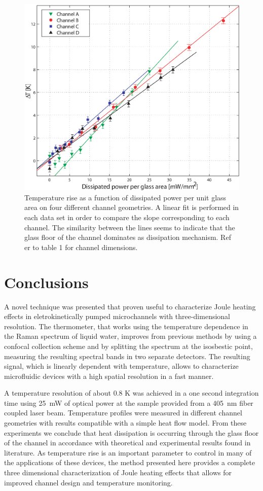 \documentclass[twocolumn]{svjour3}       %
\begin{document}
\begin{figure}[h!]
\centering
\includegraphics[width=\columnwidth]{figs/fig8.eps}
\caption{Temperature rise as a function of dissipated power per unit glass area on four different channel geometries. A linear fit is performed in each data set in order to compare the slope corresponding to each channel. The similarity between the lines seems to indicate that the glass floor of the channel dominates as dissipation mechanism. Ref er to table 1 for channel dimensions.\label{fig:rectas}}
\end{figure}

\section{Conclusions}

A novel technique was presented that proven useful to characterize Joule heating effects in eletrokinetically pumped microchannels with three-dimensional resolution. The thermometer, that works using the temperature dependence in the Raman spectrum of liquid water, improves from previous methods by using a confocal collection scheme and by splitting the spectrum at the isosbestic point, measuring the resulting spectral bands in two separate detectors. The resulting signal, which is linearly dependent with temperature, allows to characterize microfluidic devices with a high spatial resolution in a fast manner. 

 A temperature resolution of about 0.8 K was achieved in a one second integration time using 25~mW of optical power at the sample provided from a 405~nm fiber coupled laser beam. Temperature profiles were measured in different channel geometries with results compatible with a simple heat flow model. From these experiments we conclude that heat dissipation is occurring through the glass floor of the channel in accordance with theoretical and experimental results found in literature. As temperature rise is an important parameter to control in many of the applications of these devices, the method presented here provides a complete three dimensional characterization of Joule heating effects that allows for improved channel design and temperature monitoring.
\end{document}
